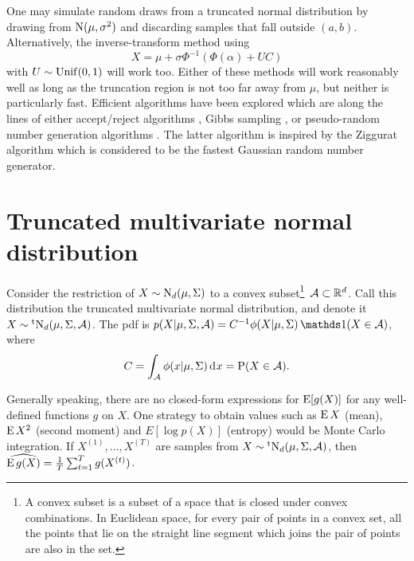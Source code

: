 One may simulate random draws from a truncated normal distribution by drawing from $\operatorname{N}(\mu,\sigma^2)$ and discarding samples that fall outside $(a,b)$.
Alternatively, the inverse-transform method using
\[
  X = \mu + \sigma\Phi^{-1}\left( \Phi(\alpha) + UC \right)
\]
with $U\sim\operatorname{Unif}(0,1)$ will work too.
Either of these methods will work reasonably well as long as the truncation region is not too far away from $\mu$, but neither is particularly fast.
Efficient algorithms have been explored which are along the lines of either accept/reject algorithms \citep{robert1995simulation}, Gibbs sampling \citep{damien2001sampling}, or pseudo-random number generation algorithms \citep{chopin2011fast}.
The latter algorithm is inspired by the Ziggurat algorithm \citep{marsaglia2000ziggurat} which is considered to be the fastest Gaussian random number generator.


\section{Truncated multivariate normal distribution}
\label{apx:truncmultinorm}

\begin{definition}
  Consider the restriction of $X\sim \operatorname{N}_d(\mu,\Sigma)$ to a convex subset\footnote{A convex subset is a subset of a space that is closed under convex combinations. In Euclidean space, for every pair of points in a convex set, all the points that lie on the straight line segment which joins the pair of points are also in the set.}~${\mathcal A} \subset \mathbb{R}^d$.
  Call this distribution the truncated multivariate normal distribution, and denote it $X \sim \operatorname{{}^tN}_d(\mu,\Sigma,{\mathcal A})$.
  The pdf is $p(X|\mu,\Sigma,\cA) = C^{-1}\phi(X|\mu,\Sigma)\ind(X\in\cA)$, where
  \[
    C = \int_{\mathcal A} \phi(x|\mu,\Sigma) \operatorname{d}\hspace{0.5pt}\! x = \operatorname{P}(X \in {\mathcal A}).
  \] 
\end{definition}

Generally speaking, there are no closed-form expressions for $\operatorname{E} [g(X)]$ for any well-defined functions $g$ on $X$.
One strategy to obtain values such as $\operatorname{E} X$ (mean), $\operatorname{E} X^2$ (second moment) and $E [\log p(X)]$ (entropy) would be Monte Carlo integration.
If $X^{(1)},\dots,X^{(T)}$ are samples from $X\sim\operatorname{{}^tN}_d(\mu,\Sigma,{\mathcal A})$, then $\widehat{\operatorname{E} g(X)} = \frac{1}{T} \sum_{t=1}^T g(X^{(t)})$.

